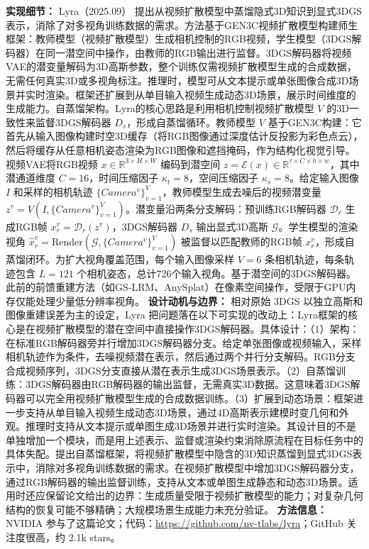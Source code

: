 \textbf{实现细节：} Lyra（2025.09） 提出从视频扩散模型中蒸馏隐式3D知识到显式3DGS表示，消除了对多视角训练数据的需求。方法基于GEN3C视频扩散模型构建师生框架：教师模型（视频扩散模型）生成相机控制的RGB视频，学生模型（3DGS解码器）在同一潜空间中操作，由教师的RGB输出进行监督。3DGS解码器将视频VAE的潜变量解码为3D高斯参数，整个训练仅需视频扩散模型生成的合成数据，无需任何真实3D或多视角标注。推理时，模型可从文本提示或单张图像合成3D场景并实时渲染。框架还扩展到从单目输入视频生成动态3D场景，展示时间维度的生成能力。自蒸馏架构。Lyra的核心思路是利用相机控制视频扩散模型 $V$ 的3D一致性来监督3DGS解码器 $D_s$，形成自蒸馏循环。教师模型 $V$ 基于GEN3C构建：它首先从输入图像构建时空3D缓存（将RGB图像通过深度估计反投影为彩色点云），然后将缓存从任意相机姿态渲染为RGB图像和遮挡掩码，作为结构化视觉引导。视频VAE将RGB视频 $x \in \mathbb{R}^{3 \times H \times W}$ 编码到潜空间 $z = \mathcal{E}(x) \in \mathbb{R}^{\tau \times C \times h \times w}$，其中潜通道维度 $C=16$，时间压缩因子 $\kappa_t=8$，空间压缩因子 $\kappa_s=8$。给定输入图像 $I$ 和采样的相机轨迹 $\{Camera^{v}\}_{v=1}^{V}$，教师模型生成去噪后的视频潜变量 $z^v = V(I, \{Camera^{v}\}_{v=1}^{V})$。潜变量沿两条分支解码：预训练RGB解码器 $\mathcal{D}_r$ 生成RGB帧 $x^v_r = \mathcal{D}_r(z^v)$，3DGS解码器 $D_s$ 输出显式3D高斯 $\mathcal{G}$。学生模型的渲染视角 $\hat{x}^v_r = \mathrm{Render}(\mathcal{G}, \{Camera^{v}\}_{v=1}^{V})$ 被监督以匹配教师的RGB帧 $x^v_r$，形成自蒸馏闭环。为扩大视角覆盖范围，每个输入图像采样 $V=6$ 条相机轨迹，每条轨迹包含 $L=121$ 个相机姿态，总计726个输入视角。基于潜空间的3DGS解码器。此前的前馈重建方法（如GS-LRM、AnySplat）在像素空间操作，受限于GPU内存仅能处理少量低分辨率视角。
\textbf{设计动机与边界：} 相对原始 3DGS 以独立高斯和图像重建误差为主的设定，Lyra 把问题落在以下可实现的改动上：Lyra框架的核心是在视频扩散模型的潜在空间中直接操作3DGS解码器。具体设计：（1）架构：在标准RGB解码器旁并行增加3DGS解码器分支。给定单张图像或视频输入，采样相机轨迹作为条件，去噪视频潜在表示，然后通过两个并行分支解码。RGB分支合成视频序列，3DGS分支直接从潜在表示生成3DGS场景表示。（2）自蒸馏训练：3DGS解码器由RGB解码器的输出监督，无需真实3D数据。这意味着3DGS解码器可以完全用视频扩散模型生成的合成数据训练。（3）扩展到动态场景：框架进一步支持从单目输入视频生成动态3D场景，通过4D高斯表示建模时变几何和外观。推理时支持从文本提示或单图生成3D场景并进行实时渲染。其设计目的不是单独增加一个模块，而是用上述表示、监督或渲染约束消除原流程在目标任务中的具体失配。提出自蒸馏框架，将视频扩散模型中隐含的3D知识蒸馏到显式3DGS表示中，消除对多视角训练数据的需求。在视频扩散模型中增加3DGS解码器分支，通过RGB解码器的输出监督训练，支持从文本或单图生成静态和动态3D场景。适用时还应保留论文给出的边界：生成质量受限于视频扩散模型的能力；对复杂几何结构的恢复可能不够精确；大规模场景生成能力未充分验证。
\textbf{方法信息：} NVIDIA 参与了这篇论文；代码：\url{https://github.com/nv-tlabs/lyra}；GitHub 关注度很高，约 2.1k stars。


